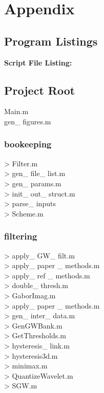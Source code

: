 \documentclass[./rarnold_final_project.tex]{subfiles}
\begin{document}
\clearpage

\section{Appendix}

\subsection*{Program Listings}

\noindent \textbf{Script File Listing:}


\subsection*{Project Root}
\noindent Main.m \\
\noindent gen\_ figures.m
\subsubsection*{bookeeping}
> Filter.m \\
\indent > gen\_ file\_ list.m \\
\indent > gen\_ params.m \\
\indent > init\_ out\_ struct.m\\
\indent > parse\_ inputs \\
\indent > Scheme.m

\subsubsection*{filtering}
> apply\_ GW\_ filt.m \\
\indent > apply\_ paper \_ methods.m \\
\indent > apply\_ ref \_ methods.m \\
\indent > double\_ thresh.m \\
\indent > GaborImag.m \\
\indent > apply\_ paper \_ methods.m \\
\indent > gen\_ inter\_ data.m \\
\indent > GenGWBank.m \\
\indent > GetThresholds.m \\
\indent > hysteresis\_ link.m \\
\indent > hysteresis3d.m \\
\indent > minimax.m \\
\indent > QuantizeWavelet.m \\
\indent > SGW.m
\end{document}
